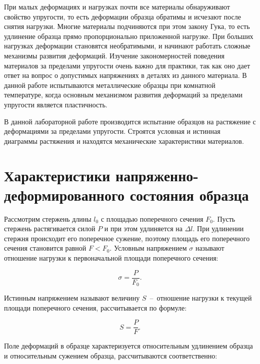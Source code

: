 \documentclass[12pt, a4paper]{article}
\begin{document}
    При малых деформациях и нагрузках почти все материалы обнаруживают свойство упругости, то есть деформации образца обратимы и исчезают после снятия нагрузки. Многие материалы подчиняются при этом закону Гука, то есть удлинение образца прямо пропорционально приложенной нагрузке. При больших нагрузках деформации становятся необратимыми, и начинают работать сложные механизмы развития деформаций. Изучение закономерностей поведения материалов за пределами упругости очень важно для практики, так как оно дает ответ на вопрос о допустимых напряжениях в деталях из данного материала. В данной работе испытываются металлические образцы при комнатной температуре, когда основным механизмом развития деформаций за пределами упругости является пластичность.
    
    В данной лабораторной работе производится испытание образцов на растяжение с деформациями за пределами упругости. Строятся условная и истинная диаграммы растяжения и находятся механические характеристики материалов.
    
    \newpage
    
    \section{Характеристики напряженно-деформированного состояния образца}
    
    Рассмотрим стержень длины $l_{0}$ с площадью поперечного сечения $F_{0}$. Пусть стержень растягивается силой $P$ и при этом удлиняется на $\Delta l$. При удлинении стержня происходит его поперечное сужение, поэтому площадь его поперечного сечения становится равной $F < F_{0}$. Условным напряжением $\sigma$ называют отношение нагрузки к первоначальной площади поперечного сечения:
    
    \begin{equation}
        \sigma = \frac{P}{F_{0}}.
        \label{eq1}
    \end{equation}
    
    Истинным напряжением называют величину $S$~--~отношение нагрузки к текущей площади поперечного сечения, рассчитывается по формуле:
    
    \begin{equation}
        S = \frac{P}{F}.
        \label{eq2}
    \end{equation}
    
    Поле деформаций в образце характеризуется относительным удлинением образца и относительным сужением образца, рассчитываются соответственно:
    
\end{document}
